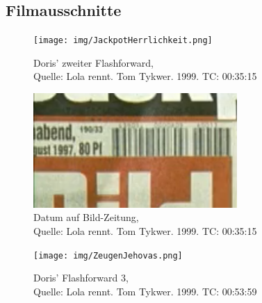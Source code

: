 %
%


%
\printbibliography{}

\begin{appendix} 

\renewcommand\section{\stdsection}

\newpage

\section*{Anhang} 
\renewcommand{\thesubsection}{\Alph{subsection}}

\subsection{Filmausschnitte} 
\label{lab:Filmausschnitt1}

\begin{figure}[htbp]
	\centering
		\texttt{[image: img/JackpotHerrlichkeit.png]}
	\caption[Doris' zweiter Flashforward]{Doris' zweiter Flashforward, \\Quelle: Lola rennt. Tom Tykwer. 1999. TC: 00:35:15}
	\label{fig:EigenschaftendesDokumentes}
\end{figure}

\begin{figure}[htbp]
	\centering
		\includegraphics[width=0.69\textwidth]{img/JackpotHerrlichkeit2.png}
	\caption[Datum auf Bild-Zeitung]{Datum auf Bild-Zeitung, \\Quelle: Lola rennt. Tom Tykwer. 1999. TC: 00:35:15}
	\label{fig:EigenschaftendesDokumentes}
\end{figure}


\begin{figure}[htbp]
	\centering
		\texttt{[image: img/ZeugenJehovas.png]}
	\caption[Doris' dritter Flashforward]{Doris' Flashforward 3, \\Quelle: Lola rennt. Tom Tykwer. 1999. TC: 00:53:59}
	\label{fig:EigenschaftendesDokumentes}
\end{figure}

\end{appendix} 


